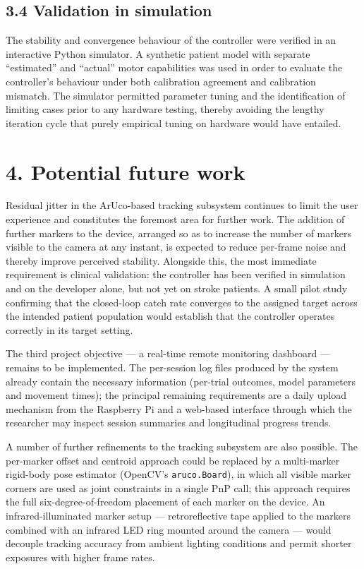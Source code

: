 \documentclass[11pt,a4paper]{article}
\begin{document}
\subsection*{3.4 Validation in simulation}

The stability and convergence behaviour of the controller were verified in an interactive Python simulator. A synthetic patient model with separate ``estimated'' and ``actual'' motor capabilities was used in order to evaluate the controller's behaviour under both calibration agreement and calibration mismatch. The simulator permitted parameter tuning and the identification of limiting cases prior to any hardware testing, thereby avoiding the lengthy iteration cycle that purely empirical tuning on hardware would have entailed.

\section*{4. Potential future work}

Residual jitter in the ArUco-based tracking subsystem continues to limit the user experience and constitutes the foremost area for further work. The addition of further markers to the device, arranged so as to increase the number of markers visible to the camera at any instant, is expected to reduce per-frame noise and thereby improve perceived stability. Alongside this, the most immediate requirement is clinical validation: the controller has been verified in simulation and on the developer alone, but not yet on stroke patients. A small pilot study confirming that the closed-loop catch rate converges to the assigned target across the intended patient population would establish that the controller operates correctly in its target setting.

The third project objective --- a real-time remote monitoring dashboard --- remains to be implemented. The per-session log files produced by the system already contain the necessary information (per-trial outcomes, model parameters and movement times); the principal remaining requirements are a daily upload mechanism from the Raspberry Pi and a web-based interface through which the researcher may inspect session summaries and longitudinal progress trends.

A number of further refinements to the tracking subsystem are also possible. The per-marker offset and centroid approach could be replaced by a multi-marker rigid-body pose estimator (OpenCV's \texttt{aruco.Board}), in which all visible marker corners are used as joint constraints in a single PnP call; this approach requires the full six-degree-of-freedom placement of each marker on the device. An infrared-illuminated marker setup --- retroreflective tape applied to the markers combined with an infrared LED ring mounted around the camera --- would decouple tracking accuracy from ambient lighting conditions and permit shorter exposures with higher frame rates.
\end{document}
